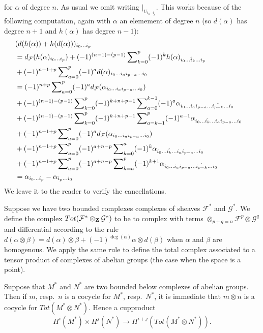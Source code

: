 for $\alpha$ of degree $n$. As usual we omit writing
$|_{U_{i_0\ldots i_p}}$. This works
because of the following computation, again with
$\alpha$ an elemement of degree $n$ (so $d(\alpha)$
has degree $n+1$ and $h(\alpha)$ has degree $n-1$):
\begin{align*}
& (
d(h(\alpha)) + h(d(\alpha))
)_{i_0\ldots i_p}
\cr
& = 
d_{\mathcal F}(h(\alpha)_{i_0\ldots i_p})
+
(-1)^{(n-1)-(p-1)}
\sum\nolimits_{k=0}^p
(-1)^k
h(\alpha)_{i_0\ldots\hat i_k\ldots i_p}
\cr
& +
(-1)^{n+1+p}
\sum\nolimits_{a=0}^p
(-1)^a
d(\alpha)_{i_0\ldots i_a i_{p-a} \ldots i_0}
\cr
& =
(-1)^{n+p}
\sum\nolimits_{a=0}^p
(-1)^a
d_{\mathcal F}(\alpha_{i_0\ldots i_a i_{p-a} \ldots i_0})
\cr
& +
(-1)^{(n-1)-(p-1)}
\sum\nolimits_{k=0}^p
(-1)^{k+n+p-1}
\sum\nolimits_{a=0}^{k-1}
(-1)^a
\alpha_{i_0\ldots i_a i_{p-a}\ldots\hat{i_{p-k}}\ldots i_0}
\cr
& +
(-1)^{(n-1)-(p-1)}
\sum\nolimits_{k=0}^p
(-1)^{k+n+p-1}
\sum\nolimits_{a=k+1}^p
(-1)^{a-1}
\alpha_{i_0\ldots\hat{i_k}\ldots i_a i_{p-a}\ldots i_0}
\cr
& +
(-1)^{n+1+p}
\sum\nolimits_{a=0}^p
(-1)^a
d_{\mathcal F}(\alpha_{i_0\ldots i_a i_{p-a} \ldots i_0})
\cr
& +
(-1)^{n+1+p}
\sum\nolimits_{a=0}^p
(-1)^{a+n-p}
\sum\nolimits_{k=0}^a
(-1)^k
\alpha_{i_0\ldots \hat{i_k}\ldots i_a i_{p-a}\ldots i_0}
\cr
& +
(-1)^{n+1+p}
\sum\nolimits_{a=0}^p
(-1)^{a+n-p}
\sum\nolimits_{k=a}^p
(-1)^{k+1}
\alpha_{i_0\ldots i_a i_{p-a}\ldots \hat{i_{p-k}}\ldots i_0}
\cr
& = 
\alpha_{i_0 \ldots i_p} - \alpha_{i_p \ldots i_0}
\end{align*}
We leave it to the reader to verify the cancellations.


\medskip\noindent
Suppose we have two bounded complexes complexes of sheaves
${\mathcal F}^*$ and ${\mathcal G}^*$. We define the complex
$Tot({\mathcal F}^*\otimes_{\bf Z} {\mathcal G}^*)$
to be to complex with terms
$\otimes_{p+q=n} {\mathcal F}^p \otimes {\mathcal G}^q$
and differential according to the rule $d(\alpha \otimes \beta) =
d(\alpha)\otimes \beta + (-1)^{\deg(\alpha)} \alpha \otimes d(\beta)$
when $\alpha$ and $\beta$ are homogenous. We apply the same rule
to define the total complex associated to a tensor product of
complexes of abelian groups (the case when the space is a point).

\medskip\noindent
Suppose that $M^*$ and $N^*$ are two bounded below
complexes of abelian groups. Then if $m$, resp.\ $n$
is a cocycle for $M^*$, resp.\ $N^*$, it is immediate 
that $m \otimes n$ is a cocycle for $Tot(M^*\otimes N^*)$.
Hence a cupproduct
$$
H^i(M^*) \times H^j(N^*) \to H^{i+j}(Tot(M^*\otimes N^*)).
$$

